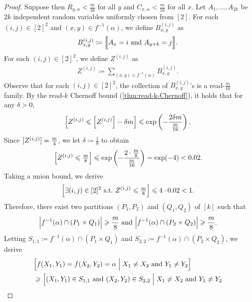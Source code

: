 \documentclass[11pt,fleqn]{article}
\renewcommand{\geq}{\geqslant}
\renewcommand{\leq}{\leqslant}
\newcommand{\defeq}{\coloneq}
\let\E\relax\DeclareMathOperator*{\E}{\mathbb{E}}  \let\Pr\relax\DeclareMathOperator*{\Pr}{\mathbb{Pr}}
\newcommand{\f}{f}
\let\Pr\relax\DeclareMathOperator*{\Pr}{\mathbb{P}}
\theoremstyle{definition}
\numberwithin{equation}{section}
\begin{document}
\begin{proof}
Suppose then $R_{y,\alpha} < \frac{m}{16}$ for all $y$ and 
$C_{x,\alpha} < \frac{m}{16}$ for all $x$.
Let $A_1, \ldots, A_{2k}$ be $2k$ independent random variables uniformly chosen from $[2]$.
For each $(i,j) \in [2]^2$ and $(x,y) \in \f^{-1}(\alpha)$,
we define $B^{(i,j)}_{x,y}$ as
\begin{align}
    B^{(i,j)}_{x,y} \defeq \Bigl\llbracket A_x = i \text{ and } A_{y+k} = j \Bigr\rrbracket.
\end{align}
For each $(i,j) \in [2]^2$,
we define $Z^{(i,j)}$ as
\begin{align}
    Z^{(i,j)} \defeq \sum_{(x,y) \in \f^{-1}(\alpha)} B^{(i,j)}_{x,y}.
\end{align}
Observe that for each $(i,j) \in [2]^2$,
the collection of $B^{(i,j)}_{x,y}$'s is a read-$\frac{m}{16}$ family.
By the read-$k$ Chernoff bound (\cref{thm:read-k-Chernoff}), it holds that for any $\delta > 0$,
\begin{align}
    \Pr\left[ Z^{(i,j)} \leq \E\left[Z^{(i,j)}\right] - \delta m \right]
    \leq \exp\left( - \frac{2\delta m}{\frac{m}{16}} \right).
\end{align}
Since $\E[Z^{(i,j)}] = \frac{m}{4}$,
we let $\delta \defeq \frac{1}{8}$ to obtain
\begin{align}
    \Pr\left[ Z^{(i,j)} \leq \tfrac{m}{8} \right] \leq 
    \exp\left( -\frac{2 \cdot \frac{m}{8}}{\frac{m}{16}} \right)
    = \exp(-4)
    < 0.02.
\end{align}
Taking a union bound, we derive
\begin{align}
    \Pr\Bigl[ \exists (i,j) \in [2]^2 \text{ s.t.~} Z^{(i,j)} \leq \tfrac{m}{8} \Bigr] \leq 4 \cdot 0.02 < 1.
\end{align}
Therefore, there exist two partitions $(P_1,P_2)$ and $(Q_1,Q_2)$ of $[k]$ such that
\begin{align}
    \Bigl| \f^{-1}(\alpha) \cap (P_1 \times Q_1) \Bigr| \geq \frac{m}{8} \text{ and }
    \Bigl| \f^{-1}(\alpha) \cap (P_2 \times Q_2) \Bigr| \geq \frac{m}{8}.
\end{align}
Letting
$S_{1,1} \defeq \f^{-1}(\alpha) \cap (P_1 \times Q_1)$ and
$S_{2,2} \defeq \f^{-1}(\alpha) \cap (P_2 \times Q_2)$, we derive
\begin{align}
\begin{aligned}
    & \Pr\Bigl[ \f(X_1,Y_1) = \f(X_2,Y_2) = \alpha \Bigm|
        X_1 \neq X_2 \text{ and } Y_1 \neq Y_2 \Bigr] \\
    & \geq \Pr\Bigl[ (X_1,Y_1) \in S_{1,1} \text{ and } (X_2,Y_2) \in S_{2,2} \Bigm|
        X_1 \neq X_2 \text{ and } Y_1 \neq Y_2

\end{aligned}
\end{align}
\end{proof}
\end{document}
